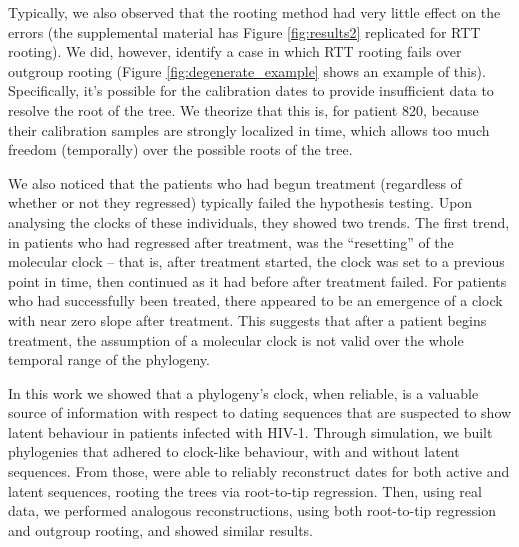 \documentclass[12pt]{article}
\begin{document}
Typically, we also observed that the rooting method had very little effect on the errors (the supplemental material has Figure \ref{fig:results2} replicated for RTT rooting). 
We did, however, identify a case in which RTT rooting fails over outgroup rooting (Figure \ref{fig:degenerate_example} shows an example of this). 
Specifically, it's possible for the calibration dates to provide insufficient data to resolve the root of the tree. 
We theorize that this is, for patient 820, because their calibration samples are strongly localized in time, which allows too much freedom (temporally) over the possible roots of the tree. 




We also noticed that the patients who had begun treatment (regardless of whether or not they regressed) typically failed the hypothesis testing. Upon analysing the clocks of these individuals, they showed two trends. 
The first trend, in patients who had regressed after treatment, was the ``resetting'' of the molecular clock -- that is, after treatment started, the clock was set to a previous point in time, then continued as it had before after treatment failed. 
For patients who had successfully been treated, there appeared to be an emergence of a clock with near zero slope after treatment.
This suggests that after a patient begins treatment, the assumption of a molecular clock  is not valid over the whole temporal range of the phylogeny. 



In this work we showed that a phylogeny's clock, when reliable, is a valuable source of information with respect to dating sequences that are suspected to show latent behaviour in patients infected with HIV-1. 
Through simulation, we built phylogenies that adhered to clock-like behaviour, with and without latent sequences.
From those, were able to reliably reconstruct dates for both active and latent sequences, rooting the trees via root-to-tip regression.
Then, using real data, we performed analogous reconstructions, using both root-to-tip regression and outgroup rooting, and showed similar results.
\end{document}
